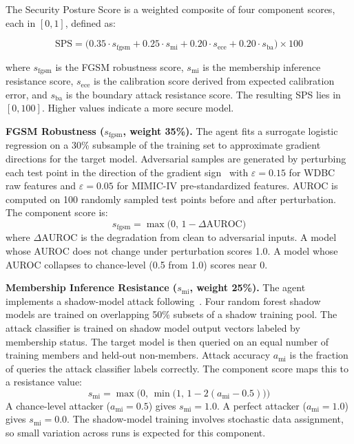 \documentclass[11pt]{article}
\begin{document}
The Security Posture Score is a weighted composite of four component scores,
each in $[0, 1]$, defined as:

\begin{equation}
\text{SPS} = \bigl(0.35 \cdot s_{\text{fgsm}} + 0.25 \cdot s_{\text{mi}}
              + 0.20 \cdot s_{\text{ece}} + 0.20 \cdot s_{\text{ba}}\bigr)
             \times 100
\label{eq:sps}
\end{equation}

where $s_{\text{fgsm}}$ is the FGSM robustness score, $s_{\text{mi}}$ is the
membership inference resistance score, $s_{\text{ece}}$ is the calibration
score derived from expected calibration error, and $s_{\text{ba}}$ is the
boundary attack resistance score. The resulting SPS lies in $[0, 100]$. Higher
values indicate a more secure model.

\textbf{FGSM Robustness ($s_{\text{fgsm}}$, weight 35\%).}
The agent fits a surrogate logistic regression on a 30\% subsample of the
training set to approximate gradient directions for the target model.
Adversarial samples are generated by perturbing each test point in the
direction of the gradient sign~\citep{goodfellow2015explaining} with
$\varepsilon = 0.15$ for WDBC raw features and $\varepsilon = 0.05$ for
MIMIC-IV pre-standardized features. AUROC is computed on 100 randomly sampled
test points before and after perturbation. The component score is:
\[
s_{\text{fgsm}} = \max\!\bigl(0,\, 1 - \Delta\text{AUROC}\bigr)
\]
where $\Delta\text{AUROC}$ is the degradation from clean to adversarial
inputs. A model whose AUROC does not change under perturbation scores 1.0.
A model whose AUROC collapses to chance-level (0.5 from 1.0) scores near 0.

\textbf{Membership Inference Resistance ($s_{\text{mi}}$, weight 25\%).}
The agent implements a shadow-model attack following~\citet{shokri2017membership}.
Four random forest shadow models are trained on overlapping 50\% subsets of
a shadow training pool. The attack classifier is trained on shadow model output
vectors labeled by membership status. The target model is then queried on
an equal number of training members and held-out non-members. Attack accuracy
$a_{\text{mi}}$ is the fraction of queries the attack classifier labels
correctly. The component score maps this to a resistance value:
\[
s_{\text{mi}} = \max\!\bigl(0,\, \min\!\bigl(1,\, 1 - 2(a_{\text{mi}} - 0.5)\bigr)\bigr)
\]
A chance-level attacker ($a_{\text{mi}} = 0.5$) gives $s_{\text{mi}} = 1.0$.
A perfect attacker ($a_{\text{mi}} = 1.0$) gives $s_{\text{mi}} = 0.0$.
The shadow-model training involves stochastic data assignment, so small
variation across runs is expected for this component.
\end{document}
